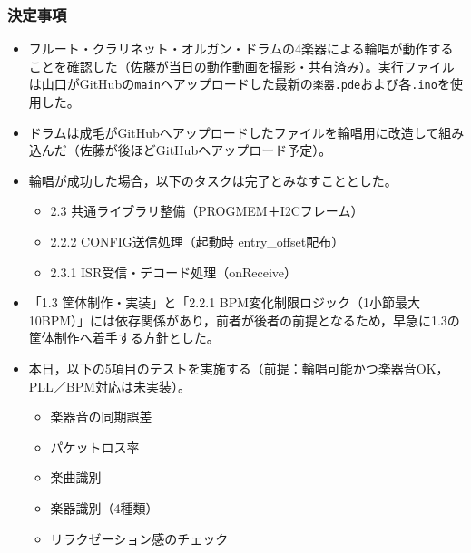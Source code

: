 \documentclass[a4paper,12pt]{ltjsarticle}
\begin{document}
\subsubsection*{決定事項}
\begin{itemize}[leftmargin=1.5em]
  \item フルート・クラリネット・オルガン・ドラムの4楽器による輪唱が動作することを確認した（佐藤が当日の動作動画を撮影・共有済み）。実行ファイルは山口がGitHubの\texttt{main}へアップロードした最新の\texttt{楽器.pde}および各\texttt{.ino}を使用した。
  \item ドラムは成毛がGitHubへアップロードしたファイルを輪唱用に改造して組み込んだ（佐藤が後ほどGitHubへアップロード予定）。
  \item 輪唱が成功した場合，以下のタスクは完了とみなすこととした。
  \begin{itemize}
    \item 2.3 共通ライブラリ整備（PROGMEM＋I2Cフレーム）
    \item 2.2.2 CONFIG送信処理（起動時 entry\_offset配布）
    \item 2.3.1 ISR受信・デコード処理（onReceive）
  \end{itemize}
  \item 「1.3 筐体制作・実装」と「2.2.1 BPM変化制限ロジック（1小節最大10BPM）」には依存関係があり，前者が後者の前提となるため，早急に1.3の筐体制作へ着手する方針とした。
  \item 本日，以下の5項目のテストを実施する（前提：輪唱可能かつ楽器音OK，PLL／BPM対応は未実装）。
  \begin{itemize}
    \item 楽器音の同期誤差
    \item パケットロス率
    \item 楽曲識別
    \item 楽器識別（4種類）
    \item リラクゼーション感のチェック
  \end{itemize}
\end{itemize}
\end{document}
